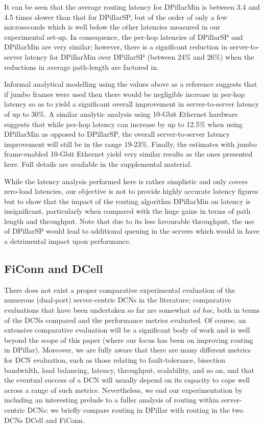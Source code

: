 \documentclass{article}
\newcounter{fig}
\begin{document}
It can be seen that the average routing latency for DPillarMin is between 3.4 and 4.5 times slower than that for DPillarSP, but of the order of only a few microseconds which is well below the other latencies measured in our experimental set-up. In consequence, the per-hop latencies of DPillarSP and DPillarMin are very similar; however, there is a significant reduction in server-to-server latency for DPillarMin over DPillarSP (between 24\% and 26\%) when the reductions in average path-length are factored in. 

Informal analytical modelling using the values above as a reference suggests that if jumbo frames were used then there would be negligible increase in per-hop latency so as to yield a significant overall improvement in server-to-server latency of up to 30\%. A similar analytic analysis using 10-Gbit Ethernet hardware suggests that while per-hop latency can increase by up to 12.5\% when using DPillarMin as opposed to DPillarSP, the overall server-to-server latency improvement will still be in the range 19-23\%. Finally, the estimates with jumbo frame-enabled 10-Gbit Ethernet yield very similar results as the ones presented here. Full details are available in the supplemental material.

While the latency analysis performed here is rather simplistic and only covers zero-load latencies, our objective is not to provide highly accurate latency figures but to show that the impact of the routing algorithm DPillarMin on latency is insignificant, particularly when compared with the huge gains in terms of path length and throughput. Note that due to its less favourable throughput, the use of DPillarSP would lead to additional queuing in the servers which would in have a detrimental impact upon performance.

\subsection{FiConn and DCell}

There does not exist a proper comparative experimental evaluation of the numerous (dual-port) server-centric DCNs in the literature; comparative evaluations that have been undertaken so far are somewhat \emph{ad hoc}, both in terms of the DCNs compared and the performance metrics evaluated. Of course, an extensive comparative evaluation will be a significant body of work and is well beyond the scope of this paper (where our focus has been on improving routing in DPillar). Moreover, we are fully aware that there are many different metrics for DCN evaluation, such as those relating to fault-tolerance, bisection bandwidth, load balancing, latency, throughput, scalability, and so on, and that the eventual success of a DCN will usually depend on its capacity to cope well across a range of such metrics. Nevertheless, we end our experimentation by including an interesting prelude to a fuller analysis of routing within server-centric DCNs: we briefly compare routing in DPillar with routing in the two DCNs DCell and FiConn.
\end{document}
